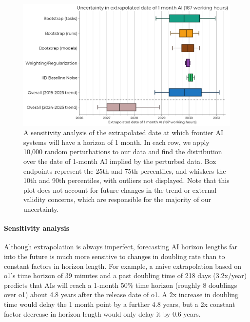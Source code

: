 \documentclass{article}
\begin{document}
\begin{figure}
    \centering
    \includegraphics[width=0.8\linewidth]{plots/multiverse/boxplot.png}
    \caption{A sensitivity analysis of the extrapolated date at which frontier AI systems will have a horizon of 1 month. In each row, we apply 10,000 random perturbations to our data and find the distribution over the date of 1-month AI implied by the perturbed data.
    Box endpoints represent the 25th and 75th percentiles, and whiskers the 10th and 90th percentiles, with outliers not displayed. Note that this plot does not account for future changes in the trend or external validity concerns, which are responsible for the majority of our uncertainty.}
    \label{fig:multiverse-boxplot}
\end{figure}

\paragraph{Sensitivity analysis} Although extrapolation is always imperfect, forecasting AI horizon lengths far into the future is much more sensitive to changes in doubling rate than to constant factors in horizon length. For example, a naive extrapolation based on o1's time horizon of 39 minutes and a past doubling time of 218 days (3.2x/year) predicts that AIs will reach a 1-month 50\% time horizon (roughly 8 doublings over o1) about 4.8 years after the release date of o1. A 2x increase in doubling time would delay the 1 month point by a further 4.8 years, but a 2x constant factor decrease in horizon length would only delay it by 0.6 years.
\end{document}
